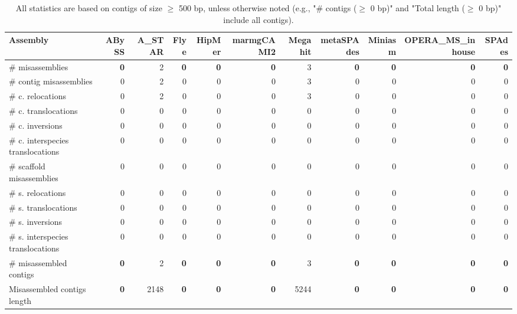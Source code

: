 \documentclass[12pt,a4paper]{article}
\begin{document}
\begin{table}[ht]
\begin{center}
\caption{All statistics are based on contigs of size $\geq$ 500 bp, unless otherwise noted (e.g., "\# contigs ($\geq$ 0 bp)" and "Total length ($\geq$ 0 bp)" include all contigs).}
\begin{tabular}{|l*{10}{|r}|}
\hline
Assembly & ABySS & A\_STAR & Flye & HipMer & marmgCAMI2 & Megahit & metaSPAdes & Miniasm & OPERA\_MS\_inhouse & SPAdes \\ \hline
\# misassemblies & {\bf 0} & 2 & {\bf 0} & {\bf 0} & {\bf 0} & 3 & {\bf 0} & {\bf 0} & {\bf 0} & {\bf 0} \\ \hline
\hspace{2mm}\# contig misassemblies & 0 & 2 & 0 & 0 & 0 & 3 & 0 & 0 & 0 & 0 \\ \hline
\hspace{5mm}\# c. relocations & 0 & 2 & 0 & 0 & 0 & 3 & 0 & 0 & 0 & 0 \\ \hline
\hspace{5mm}\# c. translocations & 0 & 0 & 0 & 0 & 0 & 0 & 0 & 0 & 0 & 0 \\ \hline
\hspace{5mm}\# c. inversions & 0 & 0 & 0 & 0 & 0 & 0 & 0 & 0 & 0 & 0 \\ \hline
\hspace{5mm}\# c. interspecies translocations & 0 & 0 & 0 & 0 & 0 & 0 & 0 & 0 & 0 & 0 \\ \hline
\hspace{2mm}\# scaffold misassemblies & 0 & 0 & 0 & 0 & 0 & 0 & 0 & 0 & 0 & 0 \\ \hline
\hspace{5mm}\# s. relocations & 0 & 0 & 0 & 0 & 0 & 0 & 0 & 0 & 0 & 0 \\ \hline
\hspace{5mm}\# s. translocations & 0 & 0 & 0 & 0 & 0 & 0 & 0 & 0 & 0 & 0 \\ \hline
\hspace{5mm}\# s. inversions & 0 & 0 & 0 & 0 & 0 & 0 & 0 & 0 & 0 & 0 \\ \hline
\hspace{5mm}\# s. interspecies translocations & 0 & 0 & 0 & 0 & 0 & 0 & 0 & 0 & 0 & 0 \\ \hline
\# misassembled contigs & {\bf 0} & 2 & {\bf 0} & {\bf 0} & {\bf 0} & 3 & {\bf 0} & {\bf 0} & {\bf 0} & {\bf 0} \\ \hline
Misassembled contigs length & {\bf 0} & 2148 & {\bf 0} & {\bf 0} & {\bf 0} & 5244 & {\bf 0} & {\bf 0} & {\bf 0} & {\bf 0} \\ \hline

\end{tabular}
\end{center}
\end{table}
\end{document}
